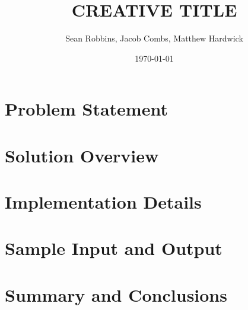 \documentclass[12pt]{article} %
\title{CREATIVE TITLE}
\author{Sean Robbins, Jacob Combs, Matthew Hardwick}
\date{\today}
\begin{document}
\maketitle
\tableofcontents

\section{Problem Statement}


\section{Solution Overview}


\section{Implementation Details}


\section{Sample Input and Output}


\section{Summary and Conclusions}


%
%
\end{document}
